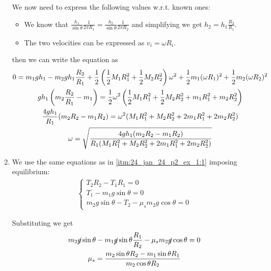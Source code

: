 \documentclass[10pt]{extarticle}
\begin{document}
\begin{solution}
\begin{enumerate}
              We now need to express the following values w.r.t. known ones:
              \begin{itemize}
                  \item We know that $\frac{h_1}{\sin \theta} \frac{1}{2 \pi R_1} = \frac{h_2}{\sin \theta}\frac{1}{2 \pi R_2}$ and simplifying we get
                        $h_2 = h_1 \frac{R_2}{R_1}$.
                  \item The two velocities can be expressed as $v_i = \omega R_i$.
              \end{itemize}
              then we can write the equation as
              \begin{gather}
                  0 = m_1 g h_1 - m_2 g h_1 \frac{R_2}{R_1} + \frac{1}{2} \left( \frac{1}{2} M_1 R_1^2 + \frac{1}{2} M_2 R_2^2 \right) \omega^2 + \frac{1}{2} m_1 (\omega R_1)^2 + \frac{1}{2} m_2 (\omega R_2)^2 \\
                  gh_1 \left(m_2 \frac{R_2}{R_1} - m_1 \right) = \frac{1}{2} \omega^2 \left( \frac{1}{2} M_1 R_1^2 + \frac{1}{2} M_2 R_2^2 + m_1 R_1^2 + m_2 R_2^2 \right) \\
                  \frac{4 g h_1}{R_1} (m_2 R_2 - m_1 R_2 ) = \omega^2 ( M_1 R_1^2 + M_2 R_2^2 + 2 m_1 R_1^2 + 2 m_2 R_2^2 ) \\
                  \omega = \sqrt{\frac{4 g h_1 (m_2 R_2 - m_1 R_2 )}{R_1 ( M_1 R_1^2 + M_2 R_2^2 + 2 m_1 R_1^2 + 2 m_2 R_2^2 )}}
              \end{gather}

        \item We use the same equations as in \ref{itm:24_jan_24_p2_ex_1:1} imposing equilibrium:
              \begin{align}
                  \begin{cases}
                      T_2 R_2 - T_1 R_1 = 0       \\
                      T_1 - m_1 g \sin \theta = 0 \\
                      m_2 g \sin \theta - T_2 - \mu_s m_2 g \cos \theta = 0
                  \end{cases}
              \end{align}

              Substituting we get
              \begin{gather}
                  m_2 \cancel{g} \sin \theta - m_1 \cancel{g} \sin \theta \frac{R_1}{R_2} - \mu_s m_2 \cancel{g} \cos \theta = 0 \\
                  \mu_s = \frac{m_2 \sin \theta R_2 - m_1 \sin \theta R_1}{m_2 \cos \theta R_2}
              \end{gather}
    \end{enumerate}
\end{solution}
\end{document}
